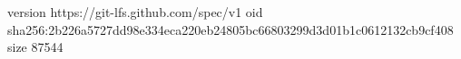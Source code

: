 version https://git-lfs.github.com/spec/v1
oid sha256:2b226a5727dd98e334eca220eb24805bc66803299d3d01b1c0612132cb9cf408
size 87544
